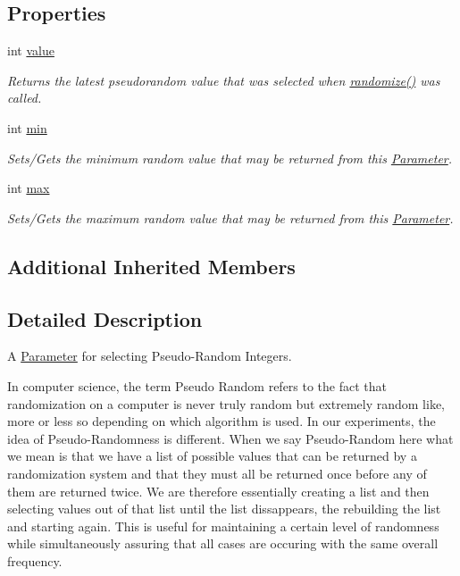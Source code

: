 \subsection*{Properties}
\begin{DoxyCompactItemize}
\item 
int \hyperlink{class_picto_1_1_pseudorandom_int_parameter_a30d983370cae42e766a8290382459c90}{value}
\begin{DoxyCompactList}\small\item\em Returns the latest pseudorandom value that was selected when \hyperlink{class_picto_1_1_pseudorandom_int_parameter_a77d69b74839fc19dd17b3b01b348a2c0}{randomize()} was called. \end{DoxyCompactList}\item 
int \hyperlink{class_picto_1_1_pseudorandom_int_parameter_ae1b16a72b8f7da941a54efb4150e2910}{min}
\begin{DoxyCompactList}\small\item\em Sets/\-Gets the minimum random value that may be returned from this \hyperlink{class_picto_1_1_parameter}{Parameter}. \end{DoxyCompactList}\item 
int \hyperlink{class_picto_1_1_pseudorandom_int_parameter_ac996a85e786771c4d1b2881426fc4ba4}{max}
\begin{DoxyCompactList}\small\item\em Sets/\-Gets the maximum random value that may be returned from this \hyperlink{class_picto_1_1_parameter}{Parameter}. \end{DoxyCompactList}\end{DoxyCompactItemize}
\subsection*{Additional Inherited Members}


\subsection{Detailed Description}
A \hyperlink{class_picto_1_1_parameter}{Parameter} for selecting Pseudo-\/\-Random Integers. 

In computer science, the term Pseudo Random refers to the fact that randomization on a computer is never truly random but extremely random like, more or less so depending on which algorithm is used. In our experiments, the idea of Pseudo-\/\-Randomness is different. When we say Pseudo-\/\-Random here what we mean is that we have a list of possible values that can be returned by a randomization system and that they must all be returned once before any of them are returned twice. We are therefore essentially creating a list and then selecting values out of that list until the list dissappears, the rebuilding the list and starting again. This is useful for maintaining a certain level of randomness while simultaneously assuring that all cases are occuring with the same overall frequency.


